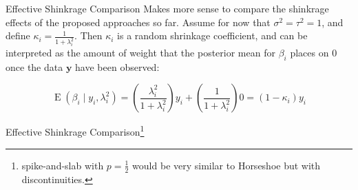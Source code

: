 \begin{frame}{Effective Shinkrage Comparison}
    Makes more sense to compare the shinkrage effects of the proposed approaches
    so far.
    Assume for now that $\sigma^2 = \tau^2 = 1$,
    and define $\kappa_i = \frac{1}{1 + \lambda_i^2}$.
    Then $\kappa_i$ is a random shrinkage coefficient,
    and can be interpreted as the amount of weight that the posterior mean for
    $\beta_i$ places on $0$ once the data $\textbf{y}$ have been observed:

    $$
        \operatorname{E}(\beta_i \mid y_i, \lambda_i^2) = 
        \left( \frac{\lambda_i^2}{1 + \lambda_i^2} \right) y_i +
        \left( \frac{1}{1 + \lambda_i^2} \right) 0 =
        (1 - \kappa_i) y_i
    $$
\end{frame}

\begin{frame}{Effective Shinkrage Comparison\footnote{spike-and-slab with $p=\frac{1}{2}$
              would be very similar to Horseshoe but with discontinuities.}}
	\centering
\end{frame}

